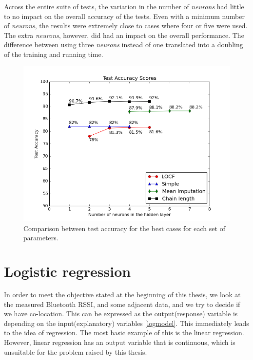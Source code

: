 Across the entire suite of tests, the variation in the number of \textit{neurons} had little to no impact on the overall accuracy of the tests. Even with a minimum number of \textit{neurons}, the results were extremely close to cases where four or five were used. The extra \textit{neurons}, however, did had an impact on the overall performance. The difference between using three \textit{neurons} instead of one translated into a doubling of the training and running time. 

\begin{figure}[h]
	\begin{center}
		\includegraphics[scale=0.6]{figures/ann_total.png}
	\end{center}
	
	\caption{Comparison between test accuracy for the best cases for each set of parameters.}
	\label{pic:ann_total}

\end{figure}
     

\section{Logistic regression}

In order to meet the objective stated at the beginning of this thesis, we look at the measured Bluetooth RSSI, and some adjacent data, and we try to decide if we have co-location. This can be expressed as the output(response) variable is depending on the input(explanatory) variables  \ref{logmodel}. This immediately leads to the idea of regression. The most basic example of this is the linear regression. However, linear regression has an output variable that is continuous, which is unsuitable for the problem raised by this thesis.

